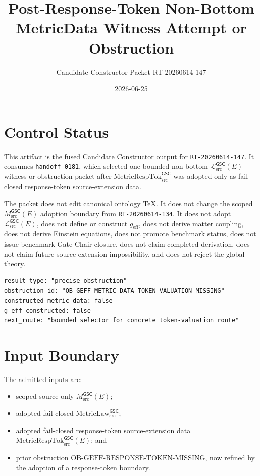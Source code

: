 \documentclass[11pt]{article}
\title{Post-Response-Token Non-Bottom MetricData Witness Attempt or Obstruction}
\author{Candidate Constructor Packet RT-20260614-147}
\date{2026-06-25}
\newcommand{\MsrcGSC}{M_{\mathrm{src}}^{\mathsf{GSC}}}
\newcommand{\MetricLaw}{\mathrm{MetricLaw}_{\mathrm{src}}^{\mathsf{GSC}}}
\newcommand{\MetricRespTok}{\mathrm{MetricRespTok}_{\mathrm{src}}^{\mathsf{GSC}}}
\newcommand{\MetricData}{\mathcal{L}_{\mathrm{src}}^{\mathsf{GSC}}}
\newcommand{\geff}{g_{\mathrm{eff}}}
\begin{document}
\maketitle

\section{Control Status}

This artifact is the fused Candidate Constructor output for
\texttt{RT-20260614-147}. It consumes \texttt{handoff-0181}, which selected
one bounded non-bottom \(\MetricData(E)\) witness-or-obstruction packet after
\(\MetricRespTok\) was adopted only as fail-closed response-token
source-extension data.

The packet does not edit canonical ontology TeX. It does not change the
scoped \(\MsrcGSC(E)\) adoption boundary from \texttt{RT-20260614-134}. It
does not adopt \(\MetricData(E)\), does not define or construct \(\geff\),
does not derive matter coupling, does not derive Einstein equations, does not
promote benchmark status, does not issue benchmark Gate Chair closure, does
not claim completed derivation, does not claim future source-extension
impossibility, and does not reject the global theory.

\begin{verbatim}
result_type: "precise_obstruction"
obstruction_id: "OB-GEFF-METRIC-DATA-TOKEN-VALUATION-MISSING"
constructed_metric_data: false
g_eff_constructed: false
next_route: "bounded selector for concrete token-valuation route"
\end{verbatim}

\section{Input Boundary}

The admitted inputs are:
\begin{itemize}[leftmargin=*]
  \item scoped source-only \(\MsrcGSC(E)\);
  \item adopted fail-closed \(\MetricLaw\);
  \item adopted fail-closed response-token source-extension data
  \(\MetricRespTok(E)\); and
  \item prior obstruction
  \(\mathrm{OB\mbox{-}GEFF\mbox{-}RESPONSE\mbox{-}TOKEN\mbox{-}MISSING}\),
  now refined by the adoption of a response-token boundary.
\end{itemize}
\end{document}
